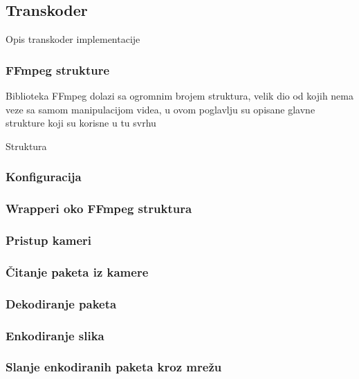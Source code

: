 \subsection{Transkoder}
Opis transkoder implementacije
\clearpage

\subsubsection{FFmpeg strukture}
Biblioteka FFmpeg dolazi sa ogromnim brojem struktura, velik dio od kojih nema veze sa samom manipulacijom videa,
u ovom poglavlju su opisane glavne strukture koji su korisne u tu svrhu

Struktura  











\clearpage
\subsubsection{Konfiguracija}

\subsubsection{Wrapperi oko FFmpeg struktura}

\subsubsection{Pristup kameri}

\subsubsection{Čitanje paketa iz kamere}

\subsubsection{Dekodiranje paketa}

\subsubsection{Enkodiranje slika}

\subsubsection{Slanje enkodiranih paketa kroz mrežu}
